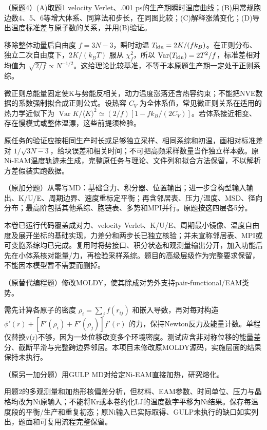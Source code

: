 \begin{exercise}\label{task:lab4-4}
（原题4）(A)取题1 velocity Verlet、.001 ps的生产期瞬时温度曲线；(B)用常规胞边数4、5、6等增大体系、同算法和步长，在同图比较；(C)解释涨落变化；(D)导出温度标准差与原子数的关系，并用(B)验证。
\end{exercise}
\begin{solution}
移除整体动量后自由度 $f=3N-3$，瞬时动温 $T_{\rm kin}=2K/(f k_B)$。在正则分布、独立二次自由度下，$2K/(k_BT)$ 服从 $\chi_f^2$，所以 $\operatorname{Var}(T_{\rm kin})=2T^2/f$，标准差相对均值为 $\sqrt{2/f}\propto N^{-1/2}$。这给理论比较基准，不等于本原题生产期一定处于正则系综。

微正则总能量固定使K与势能反相关，动力温度涨落还含热容约束；不能把NVE数据的系数强制拟合成正则公式。设热容 $C_V$ 为全体系值，常见微正则关系在适用的热力学近似下为 $\operatorname{Var}K/\langle K\rangle^2\simeq(2/f)[1-f k_B/(2C_V)]$。若体系接近相变、存在慢模式或整体温漂，这些前提须检验。

原任务的验证应按相同生产时长或足够独立采样、相同系综和初温，画相对标准差对 $1/\sqrt{3N-3}$，给块误差和相关时间；不可把高频采样数量当作独立样本数。原Ni-EAM温度轨迹未生成，完整原任务与理论、文件列和拟合方法保留，不以解析方差假装实跑数据。
\end{solution}

\begin{exercise}\label{task:lab4-extra-md}
（原加分题）从零写MD：基础含力、积分器、位置输出；进一步含构型输入输出、K/U/E、周期边界、速度重标定平衡；再含邻居表、压力/温度、MSD、径向分布；最高阶包括其他系综、胞链表、多势和MPI并行。原题按这四层各5分。
\end{exercise}
\begin{solution}
本卷已运行代码覆盖成对力、velocity Verlet、K/U/E、周期最小镜像、温度自由度及展开坐标的基础实现，力差分和两步长已独立核验；并未宣称邻居表、MPI或可变胞系综均已完成。复用时将势接口、积分状态和观测量输出分开，加入功能后先在小体系核对能量/力，再检验采样系综。题目的高级层级作为完整要求保留，不能因本模型暂不需要而删掉。
\end{solution}
\begin{exercise}\label{task:lab4-extra-moldy}
（原替代编程题）修改MOLDY，使其除成对势外支持pair-functional/EAM类势。
\end{exercise}
\begin{solution}
需先计算各原子的密度 $\rho_i=\sum_jf(r_{ij})$ 和嵌入导数，再对每对构造 $\phi'(r)+[F'(\rho_i)+F'(\rho_j)]f'(r)$ 的力，保持Newton反力及能量计数。单程仅替换v(r)不够，因为一处位移改变多个环境密度。测试应含非对称位移的能量差分、截断平滑与完整跨边界邻居。本项目未修改原MOLDY源码，实施层面的结果保持未执行。
\end{solution}
\begin{exercise}\label{task:lab4-extra-ni}
（原另一加分题）用GULP MD对给定Ni-EAM直接加热，研究熔化。
\end{exercise}
\begin{solution}
用题2的多观测量和加热形核偏差分析，但材料、EAM参数、时间单位、压力与晶格均改为Ni原输入；不能将Kr或本卷约化LJ的温度数字平移为Ni结果。保存每温度段的平衡/生产和重复初态；原Ni输入已实际取得、GULP未执行的缺口如实列出，题面和可复用流程完整保留。
\end{solution}
